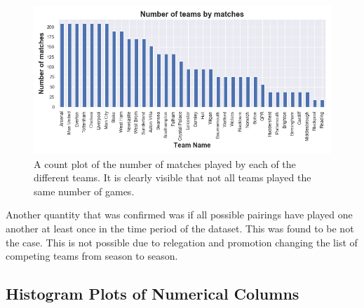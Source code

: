 \documentclass[a4paper,12pt]{article}
\begin{document}
		\begin{figure}[H]
			\centering
			
			\includegraphics[scale=0.6]{num_of_matches.png}
			\caption{A count plot of the number of matches played by each of the different teams. It is clearly visible that not all teams played the same number of games.}
		\end{figure}
		
		Another quantity that was confirmed was if all possible pairings have played one another at least once in the time period of the dataset. This was found to be not the case. This is not possible due to relegation and promotion changing the list of competing teams from season to season.  
	
	\subsection{Histogram Plots of Numerical Columns}
		
\end{document}
